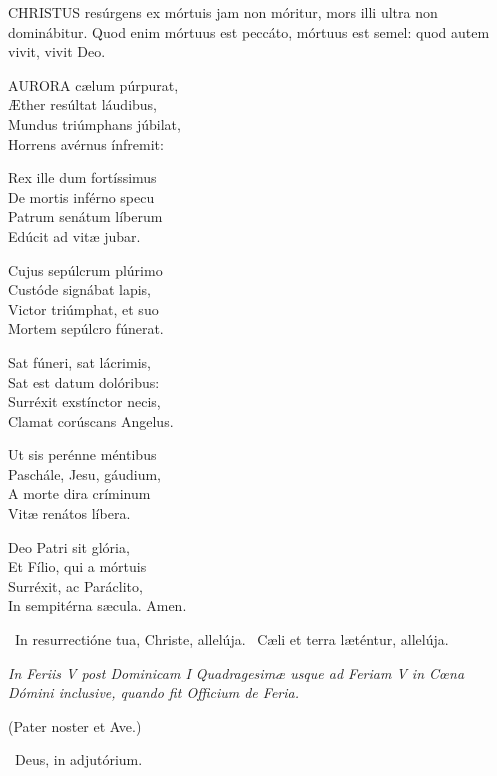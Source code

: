 \lettrine[lines=2]{C}{HRISTUS} resúrgens ex mórtuis jam non móritur, mors illi ultra non dominábitur. Quod enim mórtuus est peccáto, mórtuus est semel: quod autem vivit, vivit Deo.


\lettrine[lines=2]{A}{URORA} cælum púrpurat,\\
Æther resúltat láudibus,\\
Mundus triúmphans júbilat,\\
Horrens avérnus ínfremit:

Rex ille dum fortíssimus\\
De mortis inférno specu\\
Patrum senátum líberum\\
Edúcit ad vitæ jubar.

Cujus sepúlcrum plúrimo\\
Custóde signábat lapis,\\
Victor triúmphat, et suo\\
Mortem sepúlcro fúnerat.

Sat fúneri, sat lácrimis,\\
Sat est datum dolóribus:\\
Surréxit exstínctor necis,\\
Clamat corúscans Angelus.

Ut sis perénne méntibus\\
Paschále, Jesu, gáudium,\\
A morte dira críminum\\
Vitæ renátos líbera.

Deo Patri sit glória,\\
Et Fílio, qui a mórtuis\\
Surréxit, ac Paráclito,\\
In sempitérna sæcula. Amen.

\V\ In resurrectióne tua, Christe, allelúja. \R\ Cæli et terra læténtur, allelúja.



\sectionornament


\textit{In Feriis V post Dominicam I Quadragesimæ usque ad Feriam V in Cœna Dómini inclusive, quando fit Officium de Feria.}

(Pater noster et Ave.)

\V\ Deus, in adjutórium.

